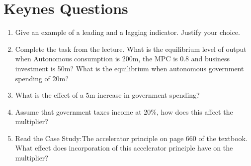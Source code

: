 \documentclass{article}
\begin{document}
\section*{Keynes Questions}
\begin{enumerate}
\item Give an example of a leading and a lagging indicator.  Justify your choice. 

\item Complete the task from the lecture.  What is the equilibrium level of output when Autonomous consumption is \textsterling 200m, the MPC is 0.8 and business investment is \textsterling 50m?  What is the equilibrium when autonomous government spending of \textsterling 20m? 

\item What is the effect of a \textsterling 5m increase in government spending? 

\item Assume that government taxes income at 20\%, how does this affect the multiplier?  

\item Read the Case Study:The accelerator principle on page 660 of the textbook.  What effect does incorporation of this accelerator principle have on the multiplier?  
\end{enumerate}
\end{document}
